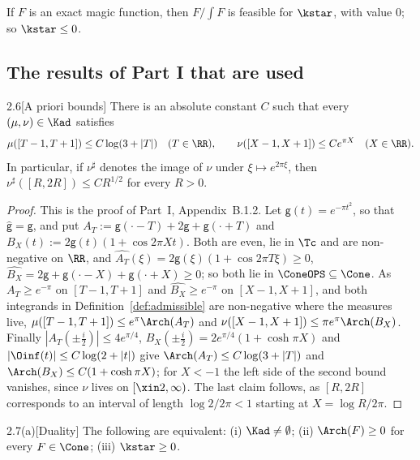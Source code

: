If $F$ is an exact magic function, then $F/\int F$ is feasible for $\kstar$, with value $0$; so $\kstar\le0$.

\subsection{The results of Part I that are used}\label{ssec:I-results}

\begin{Ilemma}{2.6}[A priori bounds]\label{lem:I-apriori}
There is an absolute constant $C$ such that every $(\mu,\nu)\in\Kad$ satisfies
\[
\mu([T-1,T+1])\le C\log(3+|T|)\quad(T\in\RR),\qquad \nu([X-1,X+1])\le Ce^{\pi X}\quad(X\in\RR).
\]
In particular, if $\nu^\sharp$ denotes the image of $\nu$ under $\xi\mapsto e^{2\pi\xi}$, then $\nu^\sharp([R,2R])\le CR^{1/2}$ for every $R>0$.
\end{Ilemma}

\begin{proof}
This is the proof of Part~I, Appendix~B.1.2. Let $\mathsf g(t)=e^{-\pi t^2}$, so that $\widehat{\mathsf g}=\mathsf g$, and put
$A_T:=\mathsf g(\cdot-T)+2\mathsf g+\mathsf g(\cdot+T)$ and $B_X(t):=2\mathsf g(t)(1+\cos2\pi Xt)$. Both are even, lie in $\Tc$ and are
non-negative on $\RR$, and $\widehat{A_T}(\xi)=2\mathsf g(\xi)(1+\cos2\pi T\xi)\ge0$, $\widehat{B_X}=2\mathsf g+\mathsf g(\cdot-X)+\mathsf g(\cdot+X)\ge0$;
so both lie in $\ConeOPS\subseteq\Cone$. As $A_T\ge e^{-\pi}$ on $[T-1,T+1]$ and $\widehat{B_X}\ge e^{-\pi}$ on
$[X-1,X+1]$, and both integrands in Definition~\ref{def:admissible} are non-negative where the measures live, $\mu([T-1,T+1])\le
e^\pi\Arch(A_T)$ and $\nu([X-1,X+1])\le\pi e^\pi\Arch(B_X)$. Finally $|A_T(\pm\frac i2)|\le4e^{\pi/4}$, $B_X(\pm\frac i2)=2e^{\pi/4}(1+\cosh\pi X)$
and $|\Oinf(t)|\le C\log(2+|t|)$ give $\Arch(A_T)\le C\log(3+|T|)$ and $\Arch(B_X)\le C(1+\cosh\pi X)$; for $X<-1$ the left side of the second
bound vanishes, since $\nu$ lives on $[\xin2,\infty)$. The last claim follows, as $[R,2R]$ corresponds to an interval of length
$\log2/2\pi<1$ starting at $X=\log R/2\pi$.
\end{proof}

\begin{Itheorem}{2.7(a)}[Duality]\label{thm:I-duality}
The following are equivalent: \textup{(i)} $\Kad\ne\emptyset$; \textup{(ii)} $\Arch(F)\ge0$ for every $F\in\Cone$; \textup{(iii)}
$\kstar\ge0$.
\end{Itheorem}

